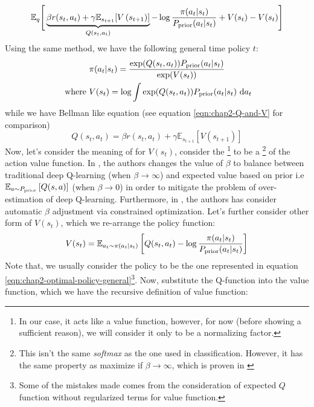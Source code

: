 \begin{equation}
    \mathbb{E}_{q} \Bigg[\underbrace{\beta r(s_t, a_t) + \gamma\mathbb{E}_{s_{t+1}}[V\left( s_{t+1} \right)]}_{Q(s_t, a_t)} - \log \frac{\pi(a_t | s_t)}{P_{\text{prior}}(a_t | s_t)} + V(s_t) - V(s_t) \Bigg] 
\end{equation}
Using the same method, we have the following general time policy $t$:
\begin{equation}
\begin{aligned}
\label{eqn:chap2-optimal-policy-general}
    &\pi(a_t | s_t) = \frac{\exp(Q(s_t, a_t)) P_{\text{prior}}(a_t | s_t)}{\exp(V(s_t))} \\
    \text{ where }&V(s_t) = \log \int \exp(Q(s_t, a_t)) P_{\text{prior}}(a_t | s_t) \ \mathrm{d} a_t
\end{aligned}
\end{equation}
while we have Bellman like equation (see equation \ref{eqn:chap2-Q-and-V} for comparison)
\begin{equation}
    Q(s_t, a_t) = \beta r(s_t, a_t) + \gamma\mathbb{E}_{s_{t+1}}[V(s_{t+1})]
\end{equation}
Now, let's consider the meaning of for $V(s_{t})$, \cite{levine2018reinforcement} consider the \footnote{In our case, it acts like a value function, however, for now (before showing a sufficient reason), we will consider it only to be a normalizing factor.} to be a \footnote{This isn't the same \textit{softmax} as the one used in classification. However, it has the same property as maximize if $\beta \rightarrow \infty$, which is proven in \cite{fellows2019virel} } of the action value function. In \cite{leibfried2017information}, the authors changes the value of $\beta$ to balance between traditional deep Q-learning (when $\beta \rightarrow \infty$) and expected value based on prior i.e $\mathbb{E}_{a\sim P_{\text{prior}}}\left[ Q(s, a) \right]$ (when $\beta \rightarrow 0$) in order to mitigate the problem of over-estimation of deep Q-learning. Furthermore, in \cite{haarnoja2018softb}, the authors has consider automatic $\beta$ adjustment via constrained optimization. Let's further consider other form of $V(s_t)$, which we re-arrange the policy function:
\begin{equation}
\label{eqn:chap2-soft-value-def-expand}
    V(s_t) = \mathbb{E}_{a_t \sim \pi(a_t | s_t)}\left[ Q(s_t, a_t) - \log \frac{\pi(a_t | s_t)}{P_{\text{prior}}(a_t | s_t)} \right]
\end{equation}
Note that, we usually consider the policy to be the one represented in equation \ref{eqn:chap2-optimal-policy-general}\footnote{Some of the mistakes made comes from the consideration of expected $Q$ function without regularized terms for value function.}. Now, substitute the Q-function into the value function, which we have the recursive definition of value function:
